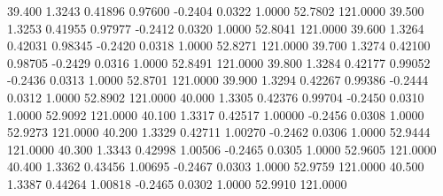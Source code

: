   39.400   1.3243   0.41896   0.97600  -0.2404   0.0322   1.0000  52.7802 121.0000
  39.500   1.3253   0.41955   0.97977  -0.2412   0.0320   1.0000  52.8041 121.0000
  39.600   1.3264   0.42031   0.98345  -0.2420   0.0318   1.0000  52.8271 121.0000
  39.700   1.3274   0.42100   0.98705  -0.2429   0.0316   1.0000  52.8491 121.0000
  39.800   1.3284   0.42177   0.99052  -0.2436   0.0313   1.0000  52.8701 121.0000
  39.900   1.3294   0.42267   0.99386  -0.2444   0.0312   1.0000  52.8902 121.0000
  40.000   1.3305   0.42376   0.99704  -0.2450   0.0310   1.0000  52.9092 121.0000
  40.100   1.3317   0.42517   1.00000  -0.2456   0.0308   1.0000  52.9273 121.0000
  40.200   1.3329   0.42711   1.00270  -0.2462   0.0306   1.0000  52.9444 121.0000
  40.300   1.3343   0.42998   1.00506  -0.2465   0.0305   1.0000  52.9605 121.0000
  40.400   1.3362   0.43456   1.00695  -0.2467   0.0303   1.0000  52.9759 121.0000
  40.500   1.3387   0.44264   1.00818  -0.2465   0.0302   1.0000  52.9910 121.0000
